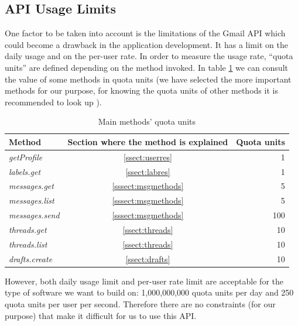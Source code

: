 \subsection{API Usage Limits} \label{ssect:apilimits}
One factor to be taken into account is the limitations of the Gmail API \citep[/v1/reference/quota]{gmailAPI} which could become a drawback in the application development. It has a limit on the daily usage and on the per-user rate. In order to measure the usage rate, ``quota units'' are defined depending on the method invoked. In table \ref{tab:quotaUnits} we can consult the value of some methods in quota units (we have selected the more important methods for our purpose, for knowing the quota units of other methods it is recommended to look up \cite[/v1/reference/quota]{gmailAPI}).

\begin{table}[h]
	\centering
	\begin{tabular}{|l c r|}
		\hline
		\textbf{Method} & \textbf{Section where the method is explained} & \textbf{Quota units} \\
		\hline\hline
		\textit{getProfile} & \ref{ssect:userres} & 1\\ \hline
		\textit{labels.get} & \ref{ssect:labres} & 1\\ \hline
		\textit{messages.get} & \ref{sssect:msgmethods} & 5\\ \hline
		\textit{messages.list} & \ref{sssect:msgmethods} & 5\\ \hline
		\textit{messages.send} & \ref{sssect:msgmethods} & 100\\ \hline
		\textit{threads.get} & \ref{ssect:threads} & 10\\ \hline
		\textit{threads.list} & \ref{ssect:threads} & 10\\ \hline
		\textit{drafts.create} & \ref{ssect:drafts} & 10\\ \hline
	\end{tabular}
	\caption{Main methods' quota units}
	\label{tab:quotaUnits}
\end{table}

However, both daily usage limit and per-user rate limit are acceptable for the type of software we want to build on: 1,000,000,000 quota units per day and 250 quota units per user per second. Therefore there are no constraints (for our purpose) that make it difficult for us to use this API.
